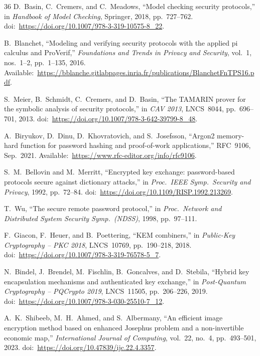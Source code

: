 \documentclass[conference]{IEEEtran}
\begin{document}
\begin{thebibliography}{36}
D.~Basin, C.~Cremers, and C.~Meadows, ``Model checking security protocols,'' in \emph{Handbook of Model Checking}, Springer, 2018, pp.~727--762. doi:~\url{https://doi.org/10.1007/978-3-319-10575-8_22}.

B.~Blanchet, ``Modeling and verifying security protocols with the applied pi calculus and ProVerif,'' \emph{Foundations and Trends in Privacy and Security}, vol.~1, nos.~1--2, pp.~1--135, 2016. Available:~\url{https://bblanche.gitlabpages.inria.fr/publications/BlanchetFnTPS16.pdf}.

S.~Meier, B.~Schmidt, C.~Cremers, and D.~Basin, ``The TAMARIN prover for the symbolic analysis of security protocols,'' in \emph{CAV 2013}, LNCS~8044, pp.~696--701, 2013. doi:~\url{https://doi.org/10.1007/978-3-642-39799-8_48}.

A.~Biryukov, D.~Dinu, D.~Khovratovich, and S.~Josefsson, ``Argon2 memory-hard function for password hashing and proof-of-work applications,'' RFC~9106, Sep.~2021. Available:~\url{https://www.rfc-editor.org/info/rfc9106}.

S.~M.~Bellovin and M.~Merritt, ``Encrypted key exchange: password-based protocols secure against dictionary attacks,'' in \emph{Proc.\ IEEE Symp.\ Security and Privacy}, 1992, pp.~72--84. doi:~\url{https://doi.org/10.1109/RISP.1992.213269}.

T.~Wu, ``The secure remote password protocol,'' in \emph{Proc.\ Network and Distributed System Security Symp.\ (NDSS)}, 1998, pp.~97--111.

F.~Giacon, F.~Heuer, and B.~Poettering, ``KEM combiners,'' in \emph{Public-Key Cryptography -- PKC 2018}, LNCS~10769, pp.~190--218, 2018. doi:~\url{https://doi.org/10.1007/978-3-319-76578-5_7}.

N.~Bindel, J.~Brendel, M.~Fischlin, B.~Goncalves, and D.~Stebila, ``Hybrid key encapsulation mechanisms and authenticated key exchange,'' in \emph{Post-Quantum Cryptography -- PQCrypto 2019}, LNCS~11505, pp.~206--226, 2019. doi:~\url{https://doi.org/10.1007/978-3-030-25510-7_12}.

A.~K.~Shibeeb, M.~H.~Ahmed, and S.~Albermany, ``An efficient image encryption method based on enhanced Josephus problem and a non-invertible economic map,'' \emph{International Journal of Computing}, vol.~22, no.~4, pp.~493--501, 2023. doi:~\url{https://doi.org/10.47839/ijc.22.4.3357}.


\end{thebibliography}
\end{document}

